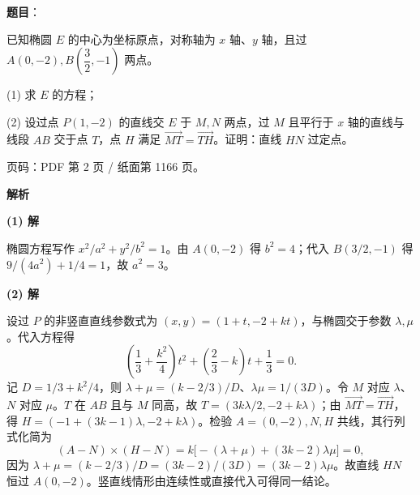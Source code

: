 \begin{answer}

\textbf{题目}：

已知椭圆 $E$ 的中心为坐标原点，对称轴为 $x$ 轴、$y$ 轴，且过 $A(0,-2),B\left(\dfrac32,-1\right)$ 两点。

  (1) 求 $E$ 的方程；

  (2) 设过点 $P(1,-2)$ 的直线交 $E$ 于 $M,N$ 两点，过 $M$ 且平行于 $x$ 轴的直线与线段 $AB$ 交于点 $T$，点 $H$ 满足 $\overrightarrow{MT}=\overrightarrow{TH}$。证明：直线 $HN$ 过定点。

\begin{gktip}
页码：PDF 第 2 页 / 纸面第 1166 页。
\end{gktip}

\textbf{解析}

\textbf{(1) 解}

椭圆方程写作 $x^2/a^2+y^2/b^2=1$。由 $A(0,-2)$ 得 $b^2=4$；代入 $B(3/2,-1)$ 得 $9/(4a^2)+1/4=1$，故 $a^2=3$。

\textbf{(2) 解}

设过 $P$ 的非竖直直线参数式为 $(x,y)=(1+t,-2+kt)$，与椭圆交于参数 $\lambda,\mu$。代入方程得
\nopagebreak[4]
\[
\left(\frac13+\frac{k^2}4\right)t^2+\left(\frac23-k\right)t+\frac13=0.
\]
记 $D=1/3+k^2/4$，则 $\lambda+\mu=(k-2/3)/D$、$\lambda\mu=1/(3D)$。令 $M$ 对应 $\lambda$、$N$ 对应 $\mu$。$T$ 在 $AB$ 且与 $M$ 同高，故 $T=(3k\lambda/2,-2+k\lambda)$；由 $\overrightarrow{MT}=\overrightarrow{TH}$，得 $H=(-1+(3k-1)\lambda,-2+k\lambda)$。检验 $A=(0,-2),N,H$ 共线，其行列式化简为
\nopagebreak[4]
\[
(A-N)\times(H-N)=k\bigl[-(\lambda+\mu)+(3k-2)\lambda\mu\bigr]=0,
\]
因为 $\lambda+\mu=(k-2/3)/D=(3k-2)/(3D)=(3k-2)\lambda\mu$。故直线 $HN$ 恒过 $A(0,-2)$。竖直线情形由连续性或直接代入可得同一结论。



\end{answer}
